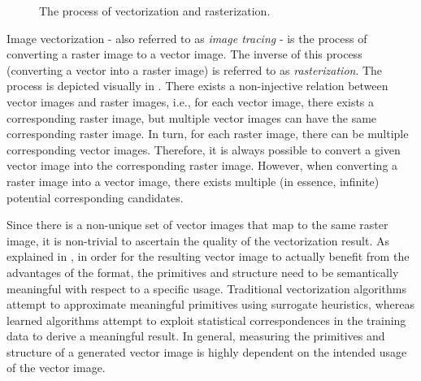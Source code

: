 \begin{figure}[h]
    \centering
    \caption{The process of vectorization and rasterization.}
    \label{fig:vectorization-process}
\end{figure}

Image vectorization - also referred to as \emph{image tracing} - is the process of converting a raster image to a vector image. The inverse of this process (converting a vector into a raster image) is referred to as \emph{rasterization}. The process is depicted visually in . There exists a non-injective relation between vector images and raster images, i.e., for each vector image, there exists a corresponding raster image, but multiple vector images can have the same corresponding raster image. In turn, for each raster image, there can be multiple corresponding vector images. Therefore, it is always possible to convert a given vector image into the corresponding raster image. However, when converting a raster image into a vector image, there exists multiple (in essence, infinite) potential corresponding candidates.

Since there is a non-unique set of vector images that map to the same raster image, it is non-trivial to ascertain the quality of the vectorization result. As explained in , in order for the resulting vector image to actually benefit from the advantages of the format, the primitives and structure need to be semantically meaningful with respect to a specific usage. Traditional vectorization algorithms attempt to approximate meaningful primitives using surrogate heuristics, whereas learned algorithms attempt to exploit statistical correspondences in the training data to derive a meaningful result. In general, measuring the primitives and structure of a generated vector image is highly dependent on the intended usage of the vector image.


